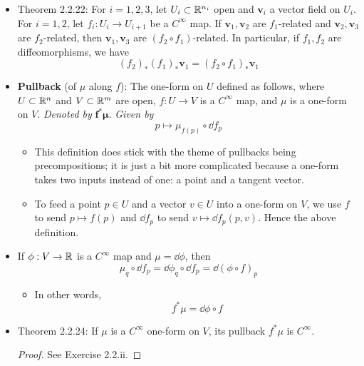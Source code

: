 \documentclass[../notes.tex]{subfiles}
\begin{document}
\begin{itemize}
\begin{proof}
\begin{equation*}
        \end{equation*}
        by virtue of the observations that if $f(p)=q$, then at the point $p$, the right-hand side above is $(\dd\phi)_q\circ\dd f_p(\bm{v}_1(p))$ by the chain rule and by definition the left hand side is $\dd\phi_q(\bm{v}_2(q))$. Moreover, by definition, $\bm{v}_2(q)=\dd f_p(\bm{v}_1(p))$ so the two sides are the same.
    \end{proof}
    \item Theorem 2.2.22: For $i=1,2,3$, let $U_i\subset\mathbb{R}^{n_i}$ open and $\bm{v}_i$ a vector field on $U_i$. For $i=1,2$, let $f_i:U_i\to U_{i+1}$ be a $C^\infty$ map. If $\bm{v}_1,\bm{v}_2$ are $f_1$-related and $\bm{v}_2,\bm{v}_3$ are $f_2$-related, then $\bm{v}_1,\bm{v}_3$ are $(f_2\circ f_1)$-related. In particular, if $f_1,f_2$ are diffeomorphisms, we have
    \begin{equation*}
        (f_2)_*(f_1)_*\bm{v}_1 = (f_2\circ f_1)_*\bm{v}_1
    \end{equation*}
    \item \textbf{Pullback} (of $\mu$ along $f$): The one-form on $U$ defined as follows, where $U\subset\mathbb{R}^n$ and $V\subset\mathbb{R}^m$ are open, $f:U\to V$ is a $C^\infty$ map, and $\mu$ is a one-form on $V$. \emph{Denoted by} $\bm{f^*\mu}$. \emph{Given by}
    \begin{equation*}
        p \mapsto \mu_{f(p)}\circ\dd{f_p}
    \end{equation*}
    \begin{itemize}
        \item This definition does stick with the theme of pullbacks being precompositions; it is just a bit more complicated because a one-form takes two inputs instead of one: a point and a tangent vector.
        \item To feed a point $p\in U$ and a vector $v\in U$ into a one-form on $V$, we use $f$ to send $p\mapsto f(p)$ and $\dd f_p$ to send $v\mapsto\dd f_p(p,v)$. Hence the above definition.
    \end{itemize}
    \item If $\phi:V\to\mathbb{R}$ is a $C^\infty$ map and $\mu=\dd{\phi}$, then
    \begin{equation*}
        \mu_q\circ\dd f_p = \dd\phi_q\circ\dd f_p
        = \dd(\phi\circ f)_p
    \end{equation*}
    \begin{itemize}
        \item In other words,
        \begin{equation*}
            f^*\mu = \dd\phi\circ f
        \end{equation*}
    \end{itemize}
    \item Theorem 2.2.24: If $\mu$ is a $C^\infty$ one-form on $V$, its pullback $f^*\mu$ is $C^\infty$.
    \begin{proof}
        See Exercise 2.2.ii.
    \end{proof}
\end{itemize}
\end{document}
